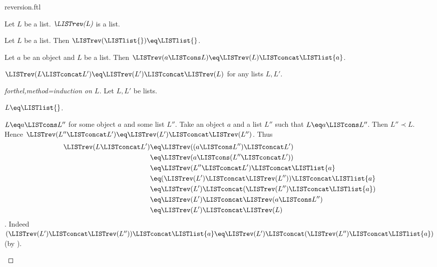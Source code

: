 \documentclass{stex}
\begin{document}
\begin{smodule}{reversion.ftl}

\begin{signature}[forthel,id=LISTS_REV_4578620297183232]
  Let $L$ be a list.
  $\emph{\LISTrev(L)}$ is a list.
\end{signature}

\begin{axiom}[forthel,id=LISTS_REV_3703161885818880]
  Let $L$ be a list.
  Then $\LISTrev(\LISTlist{}) \eq \LISTlist{}$.
\end{axiom}

\begin{axiom}[forthel,id=LISTS_REV_8050301789536256]
  Let $a$ be an object and $L$ be a list.
  Then $\LISTrev(a \LISTcons L) \eq \LISTrev(L) \LISTconcat \LISTlist{a}$.
\end{axiom}

\begin{proposition}[forthel,id=LISTS_REV_4512036658964875]
  $\LISTrev(L \LISTconcat L') \eq \LISTrev(L') \LISTconcat \LISTrev(L)$ for any lists $L, L'$.
\end{proposition}
\begin{proof}[forthel,method=induction on $L$]
  Let $L,L'$ be lists.

  \begin{case}{$L \eq \LISTlist{}$.} \end{case}

  \begin{case}{$L \eq a \LISTcons L''$ for some object $a$ and some list $L''$.}
    Take an object $a$ and a list $L''$ such that $L \eq a \LISTcons L''$.
    Then $L'' \prec L$.
    Hence $\LISTrev(L'' \LISTconcat L') \eq \LISTrev(L') \LISTconcat \LISTrev(L'')$.
    Thus
    \begin{align*}
      \LISTrev(L \LISTconcat L')
        &\eq \LISTrev((a \LISTcons L'') \LISTconcat L')\\
        &\eq \LISTrev(a \LISTcons (L'' \LISTconcat L'))\\
        &\eq \LISTrev(L'' \LISTconcat L') \LISTconcat \LISTlist{a}\\
        &\eq (\LISTrev(L') \LISTconcat \LISTrev(L'')) \LISTconcat \LISTlist{a}\\
        &\eq \LISTrev(L') \LISTconcat (\LISTrev(L'') \LISTconcat \LISTlist{a})\\
        &\eq \LISTrev(L') \LISTconcat \LISTrev(a \LISTcons L'')\\
        &\eq \LISTrev(L') \LISTconcat \LISTrev(L)
    \end{align*}.
    Indeed $(\LISTrev(L') \LISTconcat \LISTrev(L'')) \LISTconcat \LISTlist{a} \eq \LISTrev(L') \LISTconcat (\LISTrev(L'') \LISTconcat \LISTlist{a})$ (by ).
  \end{case}
\end{proof}


\end{smodule}
\end{document}
